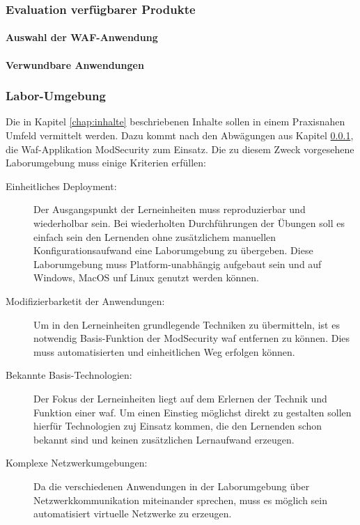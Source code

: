 \subsubsection{Evaluation verfügbarer Produkte}
\label{chap:produkt-eval}
\paragraph{Auswahl der \ac{WAF}-Anwendung}

\paragraph{Verwundbare Anwendungen}

\subsubsection{Labor-Umgebung}


Die in Kapitel \ref{chap:inhalte} beschriebenen Inhalte sollen in einem Praxisnahen Umfeld vermittelt werden.
Dazu kommt nach den Abwägungen aus Kapitel \ref{chap:produkt-eval}, die Waf-Applikation ModSecurity zum Einsatz.
Die zu diesem Zweck vorgesehene Laborumgebung muss einige Kriterien erfüllen:
\begin{description}
    \item[Einheitliches Deployment:] Der Ausgangspunkt der Lerneinheiten muss reproduzierbar und wiederholbar sein. Bei wiederholten Durchführungen der Übungen soll es einfach sein den Lernenden ohne zusätzlichem manuellen Konfigurationsaufwand eine Laborumgebung zu übergeben. Diese Laborumgebung muss Platform-unabhängig aufgebaut sein und auf Windows, MacOS unf Linux genutzt werden können.
    \item[Modifizierbarketit der Anwendungen:] Um in den Lerneinheiten grundlegende Techniken zu übermitteln, ist es notwendig Basis-Funktion der ModSecurity \ac{waf} entfernen zu können. Dies muss automatisierten und einheitlichen Weg erfolgen können.
    \item[Bekannte Basis-Technologien:] Der Fokus der Lerneinheiten liegt auf dem Erlernen der Technik und Funktion einer \ac{waf}. Um einen Einstieg möglichst direkt zu gestalten sollen hierfür Technologien zuj Einsatz kommen, die den Lernenden schon bekannt sind und keinen zusätzlichen Lernaufwand erzeugen.
    \item[Komplexe Netzwerkumgebungen:] Da die verschiedenen Anwendungen in der Laborumgebung über Netzwerkkommunikation miteinander sprechen, muss es möglich sein automatisiert virtuelle Netzwerke zu erzeugen.
\end{description}

